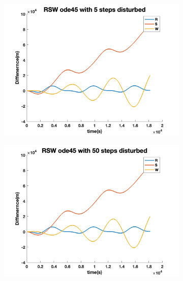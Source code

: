 \documentclass[12pt
,headinclude
,headsepline
,bibtotocnumbered
]{scrartcl}
\begin{document}
\begin{figure}[H]
\begin{subfigure}[b]{0.45\textwidth}
        \includegraphics[width=1\textwidth]{./plots/ode45_5_yprime_d_RSW.png}
        \end{subfigure}
        \begin{subfigure}[b]{0.45\textwidth}
        \includegraphics[width=1\textwidth]{./plots/ode45_50_yprime_d_RSW.png}
        \end{subfigure}
    \end{figure} 
\end{document}
